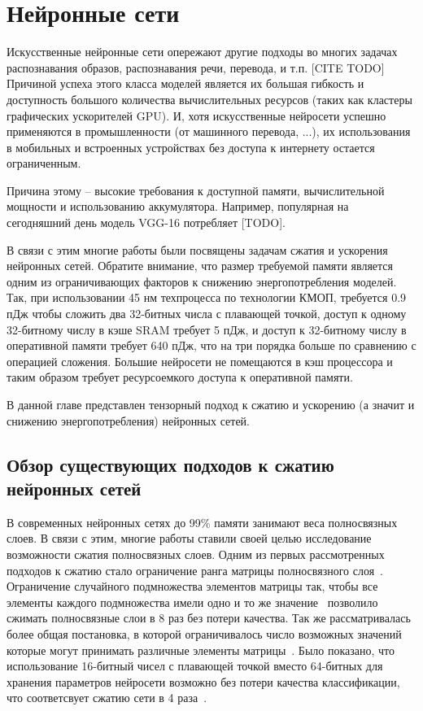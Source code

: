 \chapter{Нейронные сети} \label{chap:tensornet}
Искусственные нейронные сети опережают другие подходы во многих задачах распознавания образов, распознавания речи, перевода, и т.п. [CITE TODO]
Причиной успеха этого класса моделей является их большая гибкость и доступность большого количества вычислительных ресурсов (таких как кластеры графических ускорителей GPU).
И, хотя искусственные нейросети успешно применяются в промышленности (от машинного перевода, ...), их использования в мобильных и встроенных устройствах без доступа к интернету остается ограниченным.

Причина этому -- высокие требования к доступной памяти, вычислительной мощности и использованию аккумулятора. Например, популярная на сегодняшний день модель VGG-16 потребляет [TODO].

В связи с этим многие работы были посвящены задачам сжатия и ускорения нейронных сетей. Обратите внимание, что размер требуемой памяти является одним из ограничивающих факторов к снижению энергопотребления моделей. Так, при использовании 45 нм техпроцесса по технологии КМОП, требуется 0.9 пДж чтобы сложить два 32-битных числа с плавающей точкой, доступ к одному 32-битному числу в кэше SRAM требует 5 пДж, и доступ к 32-битному числу в оперативной памяти требует 640 пДж, что на три порядка больше по сравнению с операцией сложения. Большие нейросети не помещаются в кэш процессора и таким образом требует ресурсоемкого доступа к оперативной памяти.

В данной главе представлен тензорный подход к сжатию и ускорению (а значит и снижению энергопотребления) нейронных сетей.

\section{Обзор существующих подходов к сжатию нейронных сетей} \label{sec:tensornet-alternatives}
В современных нейронных сетях до 99\% памяти занимают веса полносвязных слоев. В связи с этим, многие работы ставили своей целью исследование возможности сжатия полносвязных слоев. Одним из первых рассмотренных подходов к сжатию стало ограничение ранга матрицы полносвязного слоя~\cite{Denil2013predicting}. Ограничение случайного подмножества элементов матрицы так, чтобы все элементы каждого подмножества имели одно и то же значение~\cite{chen2015compressing} позволило сжимать полносвязные слои в 8 раз без потери качества. Так же рассматривалась более общая постановка, в которой ограничивалось число возможных значений которые могут принимать различные элементы матрицы~\cite{gong2014PQcompressing}. Было показано, что использование 16-битный чисел с плавающей точкой вместо 64-битных  для хранения параметров нейросети возможно без потери качества классификации, что соответсвует сжатию сети в 4 раза~\cite{Gupta2015floatingPoint}.


